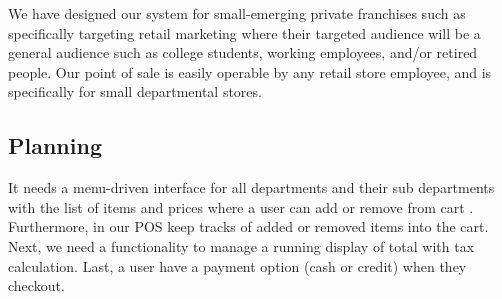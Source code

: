 \documentclass[10pt,conference,onecolumn,compsoc]{IEEEtran}
\begin{document}
	We have designed our system for small-emerging private franchises such as specifically targeting retail marketing where their targeted audience will be a general audience such as college students, working employees, and/or retired people. Our point of sale is easily operable by any retail store employee, and  is specifically for small departmental stores.






\subsection{Planning}
 It needs a menu-driven interface for all departments and their sub departments with the list of items and prices where a user can add or remove from cart . Furthermore, in our POS keep tracks of added or removed items into the cart. Next, we need a functionality to manage a running display of total with tax calculation. Last, a user have a payment option (cash or credit) when they checkout. 




 


%
%
\end{document}
